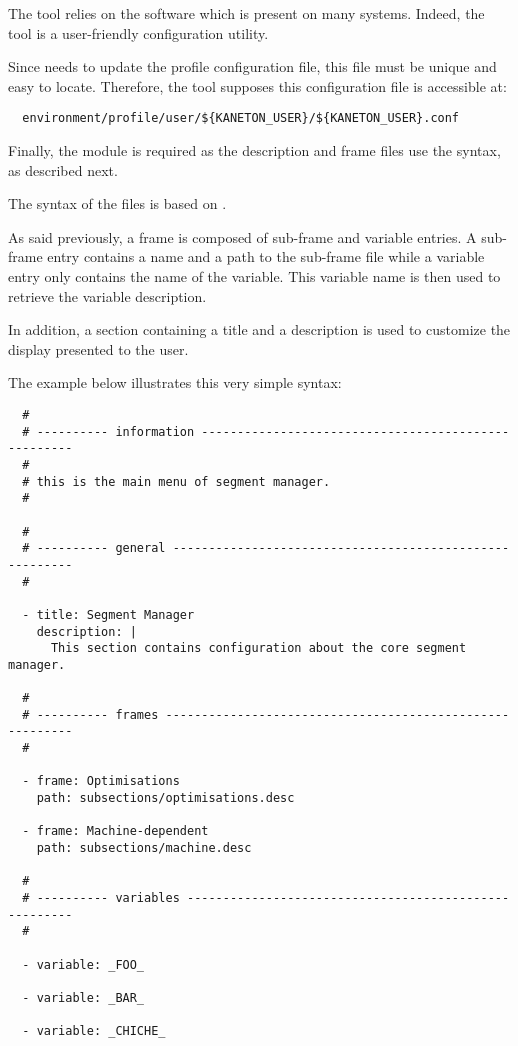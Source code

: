 

The  tool relies on the  software which
is present on many  systems. Indeed, the 
tool is a user-friendly configuration utility.

Since  needs to update the  profile
configuration file, this file must be unique and easy to locate. Therefore,
the  tool supposes this configuration file is accessible at:

\begin{verbatim}
  environment/profile/user/${KANETON_USER}/${KANETON_USER}.conf
\end{verbatim}

Finally, the  module  is required as the
description and frame files use the  syntax, as described next.



The syntax of the  files  is based on .

As said previously, a frame is composed of sub-frame and variable entries. A
sub-frame entry contains a name and a path to the sub-frame 
file while a variable entry only contains the name of the variable. This
variable name is then used to retrieve the variable description.

In addition, a section containing a title and a description is used to
customize the display presented to the user.

The example below illustrates this very simple syntax:

\begin{verbatim}
  #
  # ---------- information ----------------------------------------------------
  #
  # this is the main menu of segment manager.
  #

  #
  # ---------- general --------------------------------------------------------
  #

  - title: Segment Manager
    description: |
      This section contains configuration about the core segment manager.

  #
  # ---------- frames ---------------------------------------------------------
  #

  - frame: Optimisations
    path: subsections/optimisations.desc

  - frame: Machine-dependent
    path: subsections/machine.desc

  #
  # ---------- variables ------------------------------------------------------
  #

  - variable: _FOO_

  - variable: _BAR_

  - variable: _CHICHE_
\end{verbatim}
